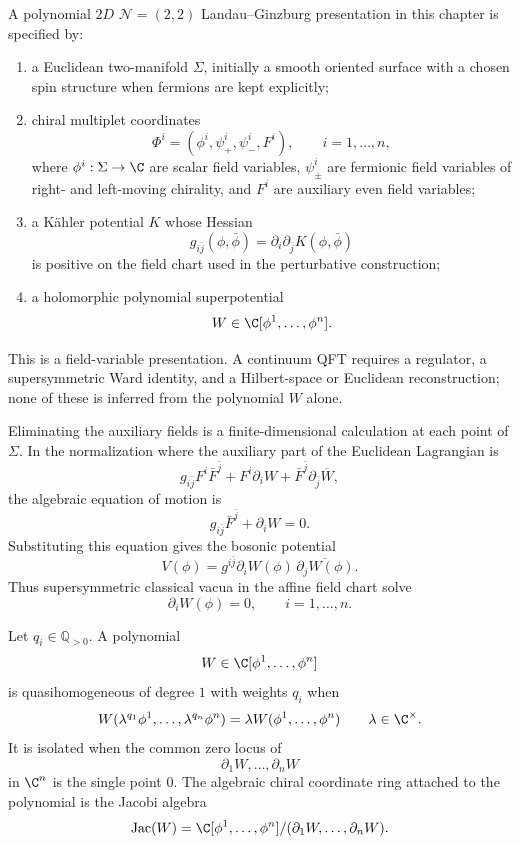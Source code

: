 \begin{definition}
\label{def:two-dimensional-lg-presentation}
A polynomial \(2D\) \(\mathcal N=(2,2)\) Landau--Ginzburg presentation in this
chapter is specified by:
\begin{enumerate}
\item a Euclidean two-manifold \(\Sigma\), initially a smooth oriented
surface with a chosen spin structure when fermions are kept explicitly;
\item chiral multiplet coordinates
\[
  \Phi^i=(\phi^i,\psi^i_+,\psi^i_-,F^i),
  \qquad i=1,\ldots,n,
\]
where \(\phi^i:\Sigma\to\C\) are scalar field variables, \(\psi^i_\pm\) are
fermionic field variables of right- and left-moving chirality, and \(F^i\)
are auxiliary even field variables;
\item a K\"ahler potential \(K\) whose Hessian
\[
  g_{i\bar j}(\phi,\bar\phi)=\partial_i\partial_{\bar j}K(\phi,\bar\phi)
\]
is positive on the field chart used in the perturbative construction;
\item a holomorphic polynomial superpotential
\[
  W\in\C[\phi^1,\ldots,\phi^n].
\]
\end{enumerate}
This is a field-variable presentation.  A continuum QFT requires a
regulator, a supersymmetric Ward identity, and a Hilbert-space or Euclidean
reconstruction; none of these is inferred from the polynomial \(W\) alone.
\end{definition}

Eliminating the auxiliary fields is a finite-dimensional calculation at each
point of \(\Sigma\).  In the normalization where the auxiliary part of the
Euclidean Lagrangian is
\[
  g_{i\bar j}F^i\bar F^{\bar j}
  +F^i\partial_iW+\bar F^{\bar j}\partial_{\bar j}\overline W ,
\]
the algebraic equation of motion is
\[
  g_{i\bar j}\bar F^{\bar j}+\partial_iW=0 .
\]
Substituting this equation gives the bosonic potential
\[
  V(\phi)=g^{i\bar j}\partial_iW(\phi)\,
  \overline{\partial_jW(\phi)}.
\]
Thus supersymmetric classical vacua in the affine field chart solve
\[
  \partial_iW(\phi)=0,\qquad i=1,\ldots,n.
\]

\begin{definition}
\label{def:vii-quasihomogeneous-lg-polynomial}
Let \(q_i\in\mathbb Q_{>0}\).  A polynomial
\[
  W\in\C[\phi^1,\ldots,\phi^n]
\]
is quasihomogeneous of degree \(1\) with weights \(q_i\) when
\begin{equation}
  W(\lambda^{q_1}\phi^1,\ldots,\lambda^{q_n}\phi^n)
  =
  \lambda W(\phi^1,\ldots,\phi^n)
  \qquad
  \lambda\in\C^\times .
  \label{eq:vii-lg-quasihomogeneous-condition}
\end{equation}
It is isolated when the common zero locus of
\[
  \partial_1W,\ldots,\partial_nW
\]
in \(\C^n\) is the single point \(0\).  The algebraic chiral coordinate ring
attached to the polynomial is the Jacobi algebra
\begin{equation}
  \operatorname{Jac}(W)
  =
  \C[\phi^1,\ldots,\phi^n]/
  (\partial_1W,\ldots,\partial_nW).
  \label{eq:vii-lg-jacobi-ring}
\end{equation}
\end{definition}

